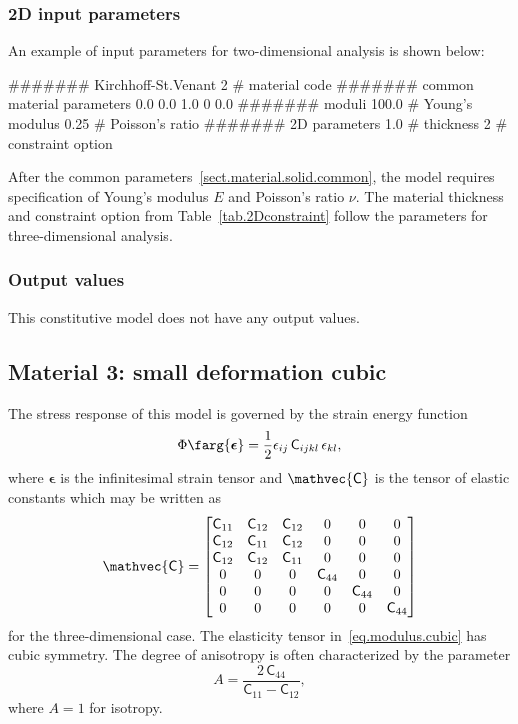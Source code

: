 \subsubsection{2D input parameters}
An example of input parameters for two-dimensional analysis is shown 
below:
\begin{inputfile}
####### Kirchhoff-St.Venant
2     # material code
####### common material parameters
0.0    0.0    1.0
0      0.0
####### moduli
100.0 # Young's modulus
0.25  # Poisson's ratio
####### 2D parameters
1.0   # thickness
2     # constraint option
\end{inputfile}
After the common parameters~\ref{sect.material.solid.common}, the 
model requires specification of Young's modulus $E$ and Poisson's 
ratio $\nu$. The material thickness and 
constraint option from Table~\ref{tab.2Dconstraint} 
follow the 
parameters for three-dimensional analysis.

\subsubsection{Output values}
This constitutive model does not have any output values.

\subsection{Material 3: small deformation cubic}
\label{sect.mat.SSCubic}
The stress response of this model is 
governed by the strain energy function
\begin{equation}
\Phi\farg{\boldsymbol{\epsilon}}=
\frac{1}{2} \epsilon_{ij}\,\mathsf{C}_{ijkl}\,\epsilon_{kl},
\end{equation}
where $\boldsymbol{\epsilon}$ is the infinitesimal strain tensor
and $\mathvec{\mathsf{C}}$ 
is the tensor of elastic constants which may be
written as
\begin{equation}
\label{eq.modulus.cubic}
	\mathvec{\mathsf{C}} =
	\begin{bmatrix}
		\mathsf{C}_{11} & \mathsf{C}_{12} & \mathsf{C}_{12} & 0 & 0 & 0 \\
	    \mathsf{C}_{12} & \mathsf{C}_{11} & \mathsf{C}_{12} & 0 & 0 & 0 \\
		\mathsf{C}_{12} & \mathsf{C}_{12} & \mathsf{C}_{11} & 0 & 0 & 0 \\
		0 & 0 & 0 & \mathsf{C}_{44} & 0 & 0 \\
		0 & 0 & 0 & 0 & \mathsf{C}_{44} & 0 \\
		0 & 0 & 0 & 0 & 0 & \mathsf{C}_{44}
	\end{bmatrix}
\end{equation}
for the three-dimensional case. The elasticity tensor in~\eqref{eq.modulus.cubic}
has cubic symmetry. The degree of anisotropy is often characterized by
the parameter
\begin{equation}
A = \frac{2\,\mathsf{C}_{44}}{\mathsf{C}_{11}-\mathsf{C}_{12}},
\end{equation}
where $A = 1$ for isotropy.

